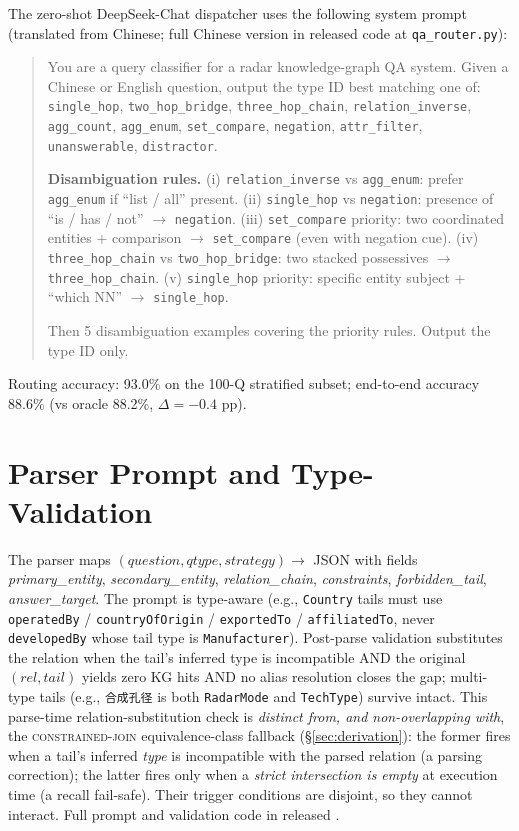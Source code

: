 \documentclass[review]{elsarticle}
\newcommand{\op}[1]{\textsc{\small #1}}
\begin{document}
The zero-shot DeepSeek-Chat dispatcher uses the following system prompt (translated from Chinese; full Chinese version in released code at \texttt{qa\_router.py}):

\begin{quote}\small
You are a query classifier for a radar knowledge-graph QA system. Given a Chinese or English question, output the type ID best matching one of: \texttt{single\_hop}, \texttt{two\_hop\_bridge}, \texttt{three\_hop\_chain}, \texttt{relation\_inverse}, \texttt{agg\_count}, \texttt{agg\_enum}, \texttt{set\_compare}, \texttt{negation}, \texttt{attr\_filter}, \texttt{unanswerable}, \texttt{distractor}.

\textbf{Disambiguation rules.} (i) \texttt{relation\_inverse} vs \texttt{agg\_enum}: prefer \texttt{agg\_enum} if ``list / all'' present. (ii) \texttt{single\_hop} vs \texttt{negation}: presence of ``is / has / not'' $\to$ \texttt{negation}. (iii) \texttt{set\_compare} priority: two coordinated entities + comparison $\to$ \texttt{set\_compare} (even with negation cue). (iv) \texttt{three\_hop\_chain} vs \texttt{two\_hop\_bridge}: two stacked possessives $\to$ \texttt{three\_hop\_chain}. (v) \texttt{single\_hop} priority: specific entity subject + ``which NN'' $\to$ \texttt{single\_hop}.

Then 5 disambiguation examples covering the priority rules. Output the type ID only.
\end{quote}

Routing accuracy: 93.0\% on the 100-Q stratified subset; end-to-end accuracy 88.6\% (vs oracle 88.2\%, $\Delta=-0.4$ pp).

\section{Parser Prompt and Type-Validation}
\label{app:parser}

The parser maps $(\textit{question}, \textit{qtype}, \textit{strategy}) \to$ JSON with fields \textit{primary\_entity}, \textit{secondary\_entity}, \textit{relation\_chain}, \textit{constraints}, \textit{forbidden\_tail}, \textit{answer\_target}. The prompt is type-aware (e.g., \texttt{Country} tails must use \texttt{operatedBy} / \texttt{countryOfOrigin} / \texttt{exportedTo} / \texttt{affiliatedTo}, never \texttt{developedBy} whose tail type is \texttt{Manufacturer}). Post-parse validation substitutes the relation when the tail's inferred type is incompatible AND the original $(rel, tail)$ yields zero KG hits AND no alias resolution closes the gap; multi-type tails (e.g., \texttt{合成孔径} is both \texttt{RadarMode} and \texttt{TechType}) survive intact. This parse-time relation-substitution check is \emph{distinct from, and non-overlapping with}, the \op{constrained-join} equivalence-class fallback (§\ref{sec:derivation}): the former fires when a tail's inferred \emph{type} is incompatible with the parsed relation (a parsing correction); the latter fires only when a \emph{strict intersection is empty} at execution time (a recall fail-safe). Their trigger conditions are disjoint, so they cannot interact. Full prompt and validation code in released .
\end{document}
